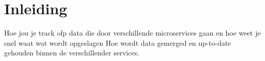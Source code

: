 \documentclass[11pt, twoside]{report}
\begin{document}
    
    \newpage
    \tableofcontents
    \newpage

    \clearpage
    \setcounter{page}{1}

    \chapter{Inleiding}
    \label{ch:inleiding}


    Hoe jou je track ofp data die door verschillende microservices gaan en hoe weet je snel waat wat wordt opgeslagen
    Hoe wordt data gemerged en up-to-date gehouden binnen de verschillender services.
\end{document}
